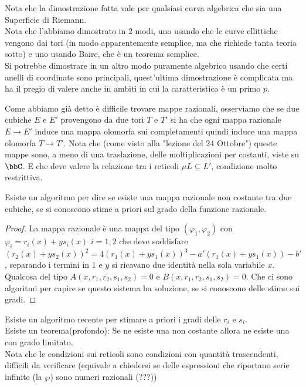 
\begin{osservazione}
Nota che la dimostrazione fatta vale per qualsiasi curva algebrica che sia una Superficie di Riemann.\\
Nota che l'abbiamo dimostrato in 2 modi, uno usando che le curve ellittiche vengono dai tori (in modo apparentemente semplice, ma che richiede tanta teoria sotto) e uno usando Baire, che è un teorema semplice.\\
Si potrebbe dimostrare in un altro modo puramente algebrico usando che certi anelli di coordinate sono principali, quest'ultima dimostrazione è complicata ma ha il pregio di valere anche in ambiti in cui la caratteristica è un primo $p$.
\end{osservazione}

Come abbiamo già detto è difficile trovare mappe razionali, osserviamo che se due cubiche $E$ e $E'$ provengono da due tori $T$ e $T'$ si ha che ogni mappa razionale $E\rightarrow E'$ induce una mappa olomorfa sui completamenti quindi induce una mappa olomorfa $T\rightarrow T'$. Nota che (come visto alla "lezione del 24 Ottobre") queste mappe sono, a meno di una traslazione, delle moltiplicazioni per costanti, viste su $\bbC$. E che deve valere la relazione tra i reticoli $\mu L\subseteq L'$, condizione molto restrittiva.

\begin{proposizione}
Esiste un algoritmo per dire se esiste una mappa razionale non costante tra due cubiche, se si conoscono stime a priori sul grado della funzione razionale.
\end{proposizione}

\begin{proof} La mappa razionale è una mappa del tipo $(\varphi_1,\varphi_2)$ con $\varphi_i=r_i(x)+y s_i(x)$ $i=1,2$  che deve soddisfare $(r_2(x)+y s_2(x))^2=4(r_1(x)+y s_1(x))^3-a'(r_1(x)+y s_1(x))-b'$, separando i termini in $1$ e $y$ si ricavano due identità nella sola variabile $x$. Qualcosa del tipo $A(x,r_1,r_2,s_1,s_2)=0$ e $B(x,r_1,r_2,s_1,s_2)=0$. Che ci sono algoritmi per capire se questo sistema ha soluzione, se si conoscono delle stime sui gradi.
\end{proof}

\begin{osservazione} Esiste un algoritmo recente per stimare a priori i gradi delle $r_i$ e $s_i$.\\
Esiste un teorema(profondo): Se ne esiste una non costante allora ne esiste una con grado limitato.\\
Nota che le condizioni sui reticoli sono condizioni con quantità trascendenti, difficili da verificare (equivale a chiedersi se delle espressioni che riportano serie infinite (la $\wp$) sono numeri razionali (???))
\end{osservazione}
